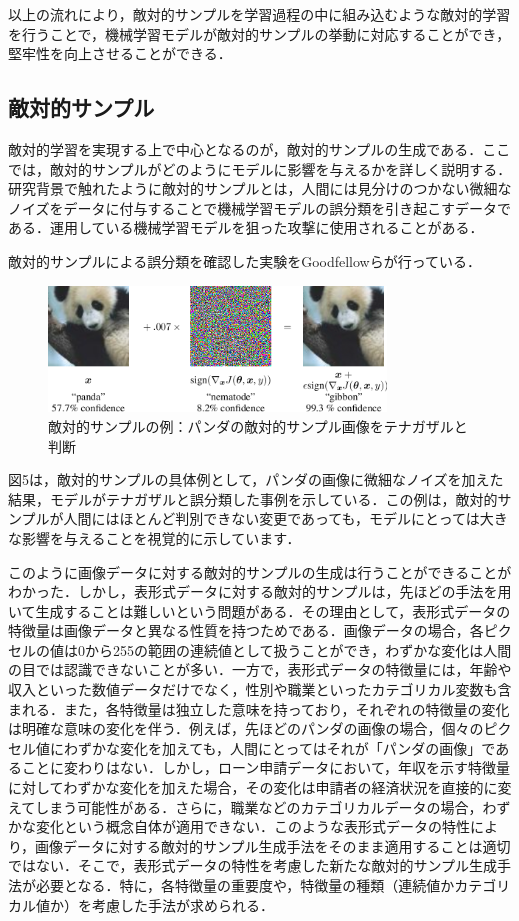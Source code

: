 以上の流れにより，敵対的サンプルを学習過程の中に組み込むような敵対的学習を行うことで，機械学習モデルが敵対的サンプルの挙動に対応することができ，堅牢性を向上させることができる．

\subsection{敵対的サンプル}
敵対的学習を実現する上で中心となるのが，敵対的サンプルの生成である．ここでは，敵対的サンプルがどのようにモデルに影響を与えるかを詳しく説明する．
研究背景で触れたように敵対的サンプルとは，人間には見分けのつかない微細なノイズをデータに付与することで機械学習モデルの誤分類を引き起こすデータである．\cite{MBSD-AdversarialExample}運用している機械学習モデルを狙った攻撃に使用されることがある．

敵対的サンプルによる誤分類を確認した実験をGoodfellowらが行っている\cite{goodfellow2015explaining}．
\begin{figure}[H]
    \centering
    \includegraphics[width=0.8\textwidth]{images/goodfellow_panda.png}
    \caption{敵対的サンプルの例：パンダの敵対的サンプル画像をテナガザルと判断\cite{goodfellow2015explaining}}
    \label{fig:adversarial_example}
\end{figure}

図5は，敵対的サンプルの具体例として，パンダの画像に微細なノイズを加えた結果，モデルがテナガザルと誤分類した事例を示している．この例は，敵対的サンプルが人間にはほとんど判別できない変更であっても，モデルにとっては大きな影響を与えることを視覚的に示しています．

このように画像データに対する敵対的サンプルの生成は行うことができることがわかった．しかし，表形式データに対する敵対的サンプルは，先ほどの手法を用いて生成することは難しいという問題がある．その理由として，表形式データの特徴量は画像データと異なる性質を持つためである．画像データの場合，各ピクセルの値は0から255の範囲の連続値として扱うことができ，わずかな変化は人間の目では認識できないことが多い．一方で，表形式データの特徴量には，年齢や収入といった数値データだけでなく，性別や職業といったカテゴリカル変数も含まれる．また，各特徴量は独立した意味を持っており，それぞれの特徴量の変化は明確な意味の変化を伴う．例えば，先ほどのパンダの画像の場合，個々のピクセル値にわずかな変化を加えても，人間にとってはそれが「パンダの画像」であることに変わりはない．しかし，ローン申請データにおいて，年収を示す特徴量に対してわずかな変化を加えた場合，その変化は申請者の経済状況を直接的に変えてしまう可能性がある．さらに，職業などのカテゴリカルデータの場合，わずかな変化という概念自体が適用できない．このような表形式データの特性により，画像データに対する敵対的サンプル生成手法をそのまま適用することは適切ではない．そこで，表形式データの特性を考慮した新たな敵対的サンプル生成手法が必要となる．特に，各特徴量の重要度や，特徴量の種類（連続値かカテゴリカル値か）を考慮した手法が求められる．


